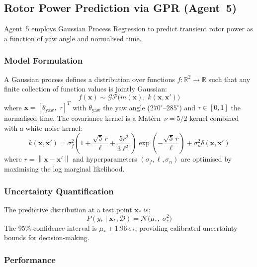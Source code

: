 \documentclass[12pt]{article}
\newcommand{\R}{\mathbb{R}}
\newcommand{\norm}[1]{\left\| #1 \right\|}
\newcommand{\vect}[1]{\mathbf{#1}}
\begin{document}
\subsection{Rotor Power Prediction via GPR (Agent~5)}
\label{sec:gpr}

Agent~5 employs Gaussian Process Regression \citep{Rasmussen2006} to predict transient rotor power as a function of yaw angle and normalised time.

\subsubsection{Model Formulation}

A Gaussian process defines a distribution over functions $f: \R^2 \to \R$ such that any finite collection of function values is jointly Gaussian:
\begin{equation}
    f(\vect{x}) \sim \mathcal{GP}\bigl(m(\vect{x}),\; k(\vect{x}, \vect{x}')\bigr)
\end{equation}
where $\vect{x} = [\theta_{\text{yaw}},\; \tau]^T$ with $\theta_{\text{yaw}}$ the yaw angle (270$^\circ$--285$^\circ$) and $\tau \in [0, 1]$ the normalised time.
The covariance kernel is a Mat\'{e}rn~$\nu = 5/2$ kernel combined with a white noise kernel:
\begin{equation}
    k(\vect{x}, \vect{x}') = \sigma_f^2 \left(1 + \frac{\sqrt{5}\, r}{\ell} + \frac{5 r^2}{3 \ell^2}\right) \exp\left(-\frac{\sqrt{5}\, r}{\ell}\right) + \sigma_n^2 \delta(\vect{x}, \vect{x}')
\end{equation}
where $r = \norm{\vect{x} - \vect{x}'}$ and hyperparameters $(\sigma_f, \ell, \sigma_n)$ are optimised by maximising the log marginal likelihood.

\subsubsection{Uncertainty Quantification}

The predictive distribution at a test point $\vect{x}_*$ is:
\begin{equation}
    P(y_* \mid \vect{x}_*, \mathcal{D}) = \mathcal{N}\bigl(\mu_*,\; \sigma_*^2\bigr)
\end{equation}
The 95\% confidence interval is $\mu_* \pm 1.96\,\sigma_*$, providing calibrated uncertainty bounds for decision-making.

\subsubsection{Performance}
\end{document}
